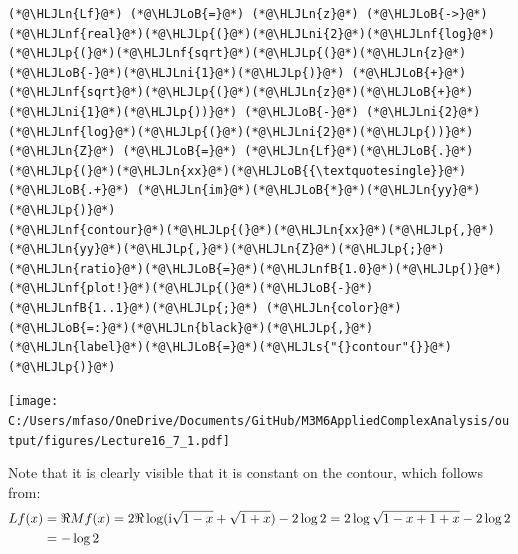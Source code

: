 \documentclass[12pt,landscape]{article}
\newcommand{\HLJLn}[1]{#1}
\newcommand{\HLJLnf}[1]{\textcolor[RGB]{66,102,213}{#1}}
\newcommand{\HLJLs}[1]{\textcolor[RGB]{201,61,57}{#1}}
\newcommand{\HLJLnfB}[1]{\textcolor[RGB]{59,151,46}{#1}}
\newcommand{\HLJLni}[1]{\textcolor[RGB]{59,151,46}{#1}}
\newcommand{\HLJLoB}[1]{\textcolor[RGB]{102,102,102}{\textbf{#1}}}
\newcommand{\HLJLp}[1]{#1}
\def\I{ {\rm i} }
\def\cent#1{\begin{center}#1\end{center} }
\begin{document}
{\begin{lstlisting}
(*@\HLJLn{Lf}@*) (*@\HLJLoB{=}@*) (*@\HLJLn{z}@*) (*@\HLJLoB{->}@*) (*@\HLJLnf{real}@*)(*@\HLJLp{(}@*)(*@\HLJLni{2}@*)(*@\HLJLnf{log}@*)(*@\HLJLp{(}@*)(*@\HLJLnf{sqrt}@*)(*@\HLJLp{(}@*)(*@\HLJLn{z}@*)(*@\HLJLoB{-}@*)(*@\HLJLni{1}@*)(*@\HLJLp{)}@*) (*@\HLJLoB{+}@*) (*@\HLJLnf{sqrt}@*)(*@\HLJLp{(}@*)(*@\HLJLn{z}@*)(*@\HLJLoB{+}@*)(*@\HLJLni{1}@*)(*@\HLJLp{))}@*) (*@\HLJLoB{-}@*) (*@\HLJLni{2}@*)(*@\HLJLnf{log}@*)(*@\HLJLp{(}@*)(*@\HLJLni{2}@*)(*@\HLJLp{))}@*)
(*@\HLJLn{Z}@*) (*@\HLJLoB{=}@*) (*@\HLJLn{Lf}@*)(*@\HLJLoB{.}@*)(*@\HLJLp{(}@*)(*@\HLJLn{xx}@*)(*@\HLJLoB{{\textquotesingle}}@*) (*@\HLJLoB{.+}@*) (*@\HLJLn{im}@*)(*@\HLJLoB{*}@*)(*@\HLJLn{yy}@*)(*@\HLJLp{)}@*)
(*@\HLJLnf{contour}@*)(*@\HLJLp{(}@*)(*@\HLJLn{xx}@*)(*@\HLJLp{,}@*)(*@\HLJLn{yy}@*)(*@\HLJLp{,}@*)(*@\HLJLn{Z}@*)(*@\HLJLp{;}@*)(*@\HLJLn{ratio}@*)(*@\HLJLoB{=}@*)(*@\HLJLnfB{1.0}@*)(*@\HLJLp{)}@*)
(*@\HLJLnf{plot!}@*)(*@\HLJLp{(}@*)(*@\HLJLoB{-}@*)(*@\HLJLnfB{1..1}@*)(*@\HLJLp{;}@*) (*@\HLJLn{color}@*)(*@\HLJLoB{=:}@*)(*@\HLJLn{black}@*)(*@\HLJLp{,}@*) (*@\HLJLn{label}@*)(*@\HLJLoB{=}@*)(*@\HLJLs{"{}contour"{}}@*)(*@\HLJLp{)}@*)
\end{lstlisting}

\cent{\texttt{[image: C:/Users/mfaso/OneDrive/Documents/GitHub/M3M6AppliedComplexAnalysis/output/figures/Lecture16\_7\_1.pdf]}}
Note that it is clearly visible that it is constant on the contour, which follows from:
\begin{align*}
L f(x)& = \Re M f(x) = 2\Re \log(\I \sqrt{1-x} + \sqrt{1+x}) -2 \log 2 = 2 \log\sqrt{1-x+1+x} - 2 \log 2 \\
& = - \log 2
\end{align*}

}
\end{document}

